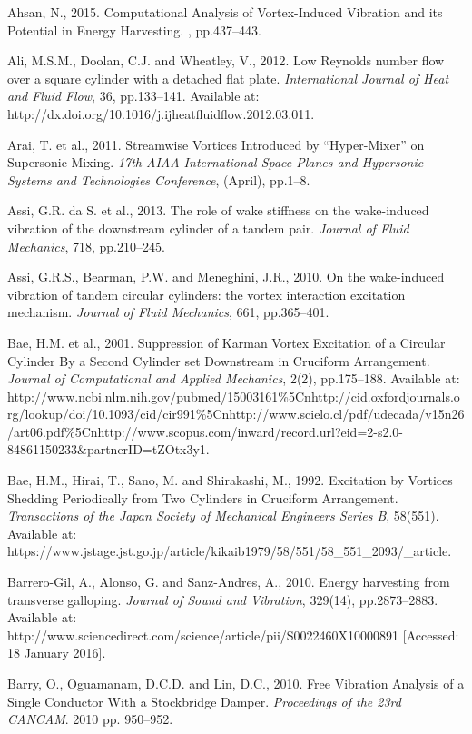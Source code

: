 \documentclass[]{article}
\begin{document}
Ahsan, N., 2015. Computational Analysis of Vortex-Induced Vibration and
its Potential in Energy Harvesting. , pp.437--443.

Ali, M.S.M., Doolan, C.J. and Wheatley, V., 2012. Low Reynolds number
flow over a square cylinder with a detached flat plate.
\emph{International Journal of Heat and Fluid Flow}, 36, pp.133--141.
Available at: http://dx.doi.org/10.1016/j.ijheatfluidflow.2012.03.011.

Arai, T. et al., 2011. Streamwise Vortices Introduced by ``Hyper-Mixer''
on Supersonic Mixing. \emph{17th AIAA International Space Planes and
Hypersonic Systems and Technologies Conference}, (April), pp.1--8.

Assi, G.R. da S. et al., 2013. The role of wake stiffness on the
wake-induced vibration of the downstream cylinder of a tandem pair.
\emph{Journal of Fluid Mechanics}, 718, pp.210--245.

Assi, G.R.S., Bearman, P.W. and Meneghini, J.R., 2010. On the
wake-induced vibration of tandem circular cylinders: the vortex
interaction excitation mechanism. \emph{Journal of Fluid Mechanics},
661, pp.365--401.

Bae, H.M. et al., 2001. Suppression of Karman Vortex Excitation of a
Circular Cylinder By a Second Cylinder set Downstream in Cruciform
Arrangement. \emph{Journal of Computational and Applied Mechanics},
2(2), pp.175--188. Available at:
http://www.ncbi.nlm.nih.gov/pubmed/15003161\%5Cnhttp://cid.oxfordjournals.org/lookup/doi/10.1093/cid/cir991\%5Cnhttp://www.scielo.cl/pdf/udecada/v15n26/art06.pdf\%5Cnhttp://www.scopus.com/inward/record.url?eid=2-s2.0-84861150233\&partnerID=tZOtx3y1.

Bae, H.M., Hirai, T., Sano, M. and Shirakashi, M., 1992. Excitation by
Vortices Shedding Periodically from Two Cylinders in Cruciform
Arrangement. \emph{Transactions of the Japan Society of Mechanical
Engineers Series B}, 58(551). Available at:
https://www.jstage.jst.go.jp/article/kikaib1979/58/551/58\_551\_2093/\_article.

Barrero-Gil, A., Alonso, G. and Sanz-Andres, A., 2010. Energy harvesting
from transverse galloping. \emph{Journal of Sound and Vibration},
329(14), pp.2873--2883. Available at:
http://www.sciencedirect.com/science/article/pii/S0022460X10000891
{[}Accessed: 18 January 2016{]}.

Barry, O., Oguamanam, D.C.D. and Lin, D.C., 2010. Free Vibration
Analysis of a Single Conductor With a Stockbridge Damper.
\emph{Proceedings of the 23rd CANCAM}. 2010 pp. 950--952.
\end{document}
